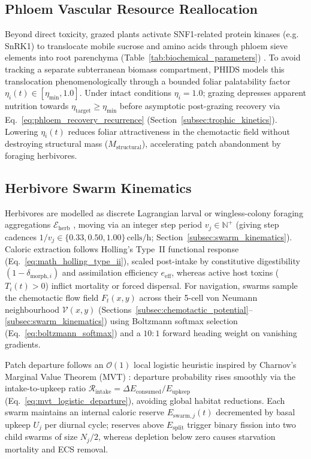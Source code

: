 \subsection{Phloem Vascular Resource Reallocation}
\label{subsec:phloem_translocation}

Beyond direct toxicity, grazed plants activate SNF1-related protein kinases (e.g. SnRK1) to translocate mobile sucrose and amino acids through phloem sieve elements into root parenchyma (Table~\ref{tab:biochemical_parameters}) \cite{schwachtje2006snf1}. To avoid tracking a separate subterranean biomass compartment, PHIDS models this translocation phenomenologically through a bounded foliar palatability factor $\eta_i(t) \in [\eta_{\min}, 1.0]$. Under intact conditions $\eta_i = 1.0$; grazing depresses apparent nutrition towards $\eta_{\text{target}} \ge \eta_{\min}$ before asymptotic post-grazing recovery via Eq.~\eqref{eq:phloem_recovery_recurrence} (Section~\ref{subsec:trophic_kinetics}). Lowering $\eta_i(t)$ reduces foliar attractiveness in the chemotactic field without destroying structural mass ($M_{\text{structural}}$), accelerating patch abandonment by foraging herbivores.

\subsection{Herbivore Swarm Kinematics}
\label{subsec:herbivore_kinematics}

Herbivores are modelled as discrete Lagrangian larval or wingless-colony foraging aggregations $\mathcal{E}_{\text{herb}}$ \cite{okubo2001diffusion, topping2003almass}, moving via an integer step period $v_j \in \mathbb{N}^+$ (giving step cadences $1/v_j \in \{0.33, 0.50, 1.00\}\,\text{cells/h}$; Section~\ref{subsec:swarm_kinematics}). Caloric extraction follows Holling's Type~II functional response \cite{holling1959components} (Eq.~\eqref{eq:math_holling_type_ii}), scaled post-intake by constitutive digestibility $(1 - \delta_{\mathrm{morph}, i})$ and assimilation efficiency $e_{\mathrm{eff}}$, whereas active host toxins ($T_i(t) > 0$) inflict mortality or forced dispersal. For navigation, swarms sample the chemotactic flow field $F_t(x, y)$ across their 5-cell von Neumann neighbourhood $\mathcal{V}(x, y)$ (Sections~\ref{subsec:chemotactic_potential}--\ref{subsec:swarm_kinematics}) using Boltzmann softmax selection (Eq.~\eqref{eq:boltzmann_softmax}) and a $10:1$ forward heading weight on vanishing gradients.

Patch departure follows an $\mathcal{O}(1)$ local logistic heuristic inspired by Charnov's Marginal Value Theorem (MVT) \cite{charnov1976optimal}: departure probability rises smoothly via the intake-to-upkeep ratio $\mathcal{R}_{\text{intake}} = \Delta E_{\text{consumed}} / E_{\text{upkeep}}$ (Eq.~\ref{eq:mvt_logistic_departure}), avoiding global habitat reductions. Each swarm maintains an internal caloric reserve $E_{\text{swarm}, j}(t)$ decremented by basal upkeep $U_j$ per diurnal cycle; reserves above $E_{\text{split}}$ trigger binary fission into two child swarms of size $N_j / 2$, whereas depletion below zero causes starvation mortality and ECS removal.
